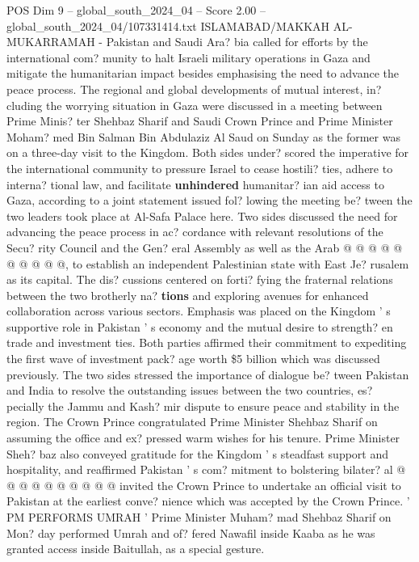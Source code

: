 \begin{textsample}{POS Dim 9 – global\_south\_2024\_04 – Score 2.00 – global\_south\_2024\_04/107331414.txt}  \label{ex:f9_pos_076}
ISLAMABAD/MAKKAH AL-MUKARRAMAH - Pakistan and Saudi Ara? bia called for efforts by the international com? munity to halt Israeli military operations in Gaza and mitigate the humanitarian impact besides emphasising the need to advance the peace process.
The regional and global developments of mutual interest, in? cluding the worrying situation in Gaza were discussed in a meeting between Prime Minis? ter Shehbaz Sharif and Saudi Crown Prince and Prime Minister Moham? med Bin Salman Bin Abdulaziz Al Saud on Sunday as the former was on a three-day visit to the Kingdom.
Both sides under? scored the imperative for the international community to pressure Israel to cease hostili? ties, adhere to interna? tional law, and facilitate \textbf{unhindered} humanitar? ian aid access to Gaza, according to a joint statement issued fol? lowing the meeting be? tween the two leaders took place at Al-Safa Palace here.
Two sides discussed the need for advancing the peace process in ac? cordance with relevant resolutions of the Secu? rity Council and the Gen? eral Assembly as well as the Arab @ @ @ @ @ @ @ @ @ @, to establish an independent Palestinian state with East Je? rusalem as its capital.
The dis? cussions centered on forti? fying the fraternal relations between the two brotherly na? \textbf{tions} and exploring avenues for enhanced collaboration across various sectors.
Emphasis was placed on the Kingdom ' s supportive role in Pakistan ' s economy and the mutual desire to strength? en trade and investment ties.
Both parties affirmed their commitment to expediting the first wave of investment pack? age worth \$5 billion which was discussed previously.
The two sides stressed the importance of dialogue be? tween Pakistan and India to resolve the outstanding issues between the two countries, es? pecially the Jammu and Kash? mir dispute to ensure peace and stability in the region.
The Crown Prince congratulated Prime Minister Shehbaz Sharif on assuming the office and ex? pressed warm wishes for his tenure.
Prime Minister Sheh? baz also conveyed gratitude for the Kingdom ' s steadfast support and hospitality, and reaffirmed Pakistan ' s com? mitment to bolstering bilater? al @ @ @ @ @ @ @ @ @ @ invited the Crown Prince to undertake an official visit to Pakistan at the earliest conve? nience which was accepted by the Crown Prince. ' PM PERFORMS UMRAH ' Prime Minister Muham? mad Shehbaz Sharif on Mon? day performed Umrah and of? fered Nawafil inside Kaaba as he was granted access inside Baitullah, as a special gesture.

\end{textsample}
